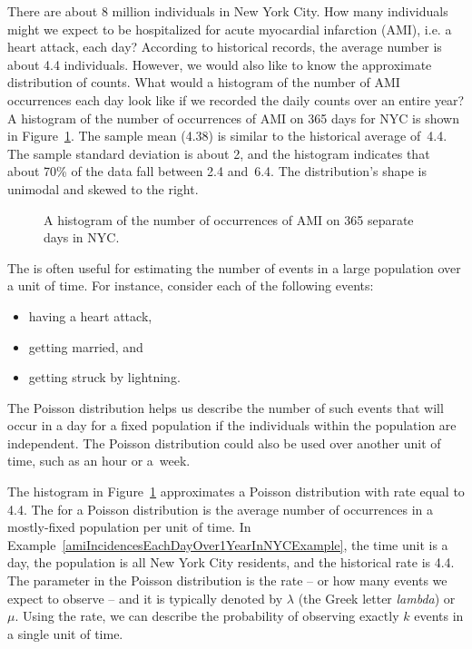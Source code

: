 \begin{examplewrap}
\begin{nexample}{There are about 8 million individuals
    in New York City.
    How many individuals might we expect to be hospitalized
    for acute myocardial infarction (AMI), i.e. a heart attack,
    each day?
    According to historical records, the average number is
    about 4.4 individuals.
    However, we would also like to know the approximate
    distribution of counts.
    What would a histogram of the number of AMI occurrences
    each day look like if we recorded the daily counts over
    an entire year?}
  \label{amiIncidencesEachDayOver1YearInNYCExample}%
  A histogram of the number of occurrences of AMI on 365 days
  for NYC is shown in
  Figure~\ref{amiIncidencesOver100Days}.\footnotemark{}
  The sample mean (4.38) is similar to the historical average
  of~4.4.
  The sample standard deviation is about 2, and the histogram
  indicates that about 70\% of the data fall between 2.4 and~6.4.
  The distribution's shape is unimodal and skewed to the right.
\end{nexample}
\end{examplewrap}

\begin{figure}[h]
  \centering
  \caption{A histogram of the number of occurrences
      of AMI on 365 separate days in NYC.}
  \label{amiIncidencesOver100Days}
\end{figure}

The  is often useful for estimating the number of events in a large population over a unit of time. For instance, consider each of the following events:
\begin{itemize}
\setlength{\itemsep}{0mm}
\item having a heart attack,
\item getting married, and
\item getting struck by lightning.
\end{itemize}
The Poisson distribution helps us describe the number of such events that will occur in a day for a fixed population if the individuals within the population are independent. The Poisson distribution could also be used over another unit of time, such as an hour or a~week.

The histogram in Figure~\ref{amiIncidencesOver100Days} approximates a Poisson distribution with rate equal to 4.4. The  for a Poisson distribution is the average number of occurrences in a mostly-fixed population per unit of time. In Example~\ref{amiIncidencesEachDayOver1YearInNYCExample}, the time unit is a day, the population is all New York City residents, and the historical rate is 4.4. The parameter in the Poisson distribution is the rate -- or how many events we expect to observe -- and it is typically denoted by $\lambda$
(the Greek letter \emph{lambda})  or $\mu$. Using the rate, we can describe the probability of observing exactly $k$ events in a single unit of time.

